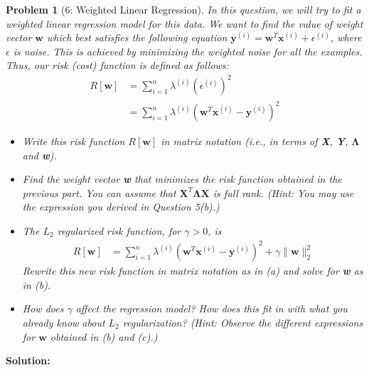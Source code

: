 \documentclass[11pt]{exam}
\theoremstyle{quest}
\newtheorem*{question}{Problem}
\begin{document}
\begin{question}[6: Weighted Linear Regression]
In this question, we will try to fit a weighted linear regression model for this
data. We want to find the value of weight vector $\textbf{w}$ which best
satisfies the following equation
$\textbf{y}^{(i)}=\textbf{w}^T\textbf{x}^{(i)}+\epsilon^{(i)}$, where $\epsilon$
is noise. This is achieved by minimizing the weighted noise for all the
examples. Thus, our risk (cost) function is defined as follows:
\begin{align*}
  R[\textbf{w}] &= \sum_{i=1}^{n} \lambda^{(i)}(\epsilon^{(i)})^2\\
                &= \sum_{i=1}^{n} \lambda^{(i)}(\textbf{w}^T\textbf{x}^{(i)}-\textbf{y}^{(i)})^2
\end{align*}
\begin{itemize}
\item[(a)] Write this risk function $R[\textbf{w}]$ in matrix notation (i.e., in
  terms of \textbf{X}, \textbf{Y}, $\boldsymbol{\Lambda}$ and \textbf{w}).
\item[(b)] Find the weight vector \textbf{w} that minimizes the risk function
  obtained in the previous part. You can assume that
  $\textbf{X}^T\boldsymbol{\Lambda}\textbf{X}$ is full rank. (Hint: You may use
  the expression you derived in Question 5(b).)
\medskip
\item[(c)] The $L_2$ regularized risk function, for $\gamma>0$, is
  \begin{align*}
    R[\textbf{w}] &= \sum_{i=1}^{n} \lambda^{(i)}(\textbf{w}^T\textbf{x}^{(i)}-\textbf{y}^{(i)})^2 + \gamma \|\textbf{w}\|^2_2
  \end{align*}
  Rewrite this new risk function in matrix notation as in (a) and solve for
  \textbf{w} as in (b).
\item[(d)] How does $\gamma$ affect the regression model? How does this fit in
  with what you already know about $L_2$ regularization? (Hint: Observe
  the different expressions for $\textbf{w}$ obtained in (b) and (c).)
\end{itemize}
\end{question}
\textbf{Solution:}




\end{document}
